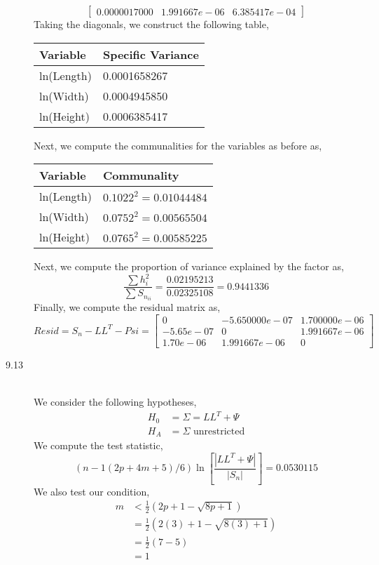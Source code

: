 \documentclass[letterpaper,10pt]{article}
\begin{document}
\begin{description}
\[\begin{bmatrix}
0.0000017000 & 1.991667e-06 & 6.385417e-04
\end{bmatrix} \]
Taking the diagonals, we construct the following table,
\begin{center}
\begin{tabular}{|l|l|}
\hline
Variable & Specific Variance\\\hline
ln(Length) & 0.0001658267\\\hline
ln(Width) & 0.0004945850\\\hline
ln(Height) & 0.0006385417\\\hline
\end{tabular}
\end{center}
Next, we compute the communalities for the variables as before as,
\begin{center}
\begin{tabular}{|l|l|}
\hline
Variable & Communality\\\hline
ln(Length) & $0.1022^2=0.01044484$\\\hline
ln(Width) & $0.0752^2=0.00565504$\\\hline
ln(Height) & $0.0765^2=0.00585225$\\\hline
\end{tabular}
\end{center}
Next, we compute the proportion of variance explained by the factor as,
\[\frac{\sum h_i^2}{\sum S_{n_{ii}}}=\frac{0.02195213}{0.02325108}=0.9441336\]
Finally, we compute the residual matrix as,
\[Resid=S_n-LL^T-Psi=\begin{bmatrix}
0 & -5.650000e-07 & 1.700000e-06\\
-5.65e-07 & 0 & 1.991667e-06\\
1.70e-06 & 1.991667e-06 & 0
\end{bmatrix} \]
\item[9.13]\hfill\\
We consider the following hypotheses,
\begin{align*}
H_0 &= \Sigma=LL^T+\Psi\\
H_A &= \Sigma\text{ unrestricted}
\end{align*}
We compute the test statistic,
\[(n-1(2p+4m+5)/6)\ln\left[\frac{|LL^T+\Psi|}{|S_n|}\right]=0.0530115\]
We also test our condition,
\begin{align*}
m &< \frac{1}{2}\left(2p+1-\sqrt{8p+1}\right)\\
&=\frac{1}{2}(2(3)+1-\sqrt{8(3)+1})\\
&=\frac{1}{2}(7-5)\\
&=1
\end{align*}

\end{description}
\end{document}
